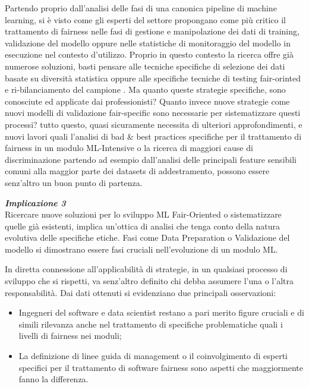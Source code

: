     Partendo proprio dall'analisi delle fasi di una canonica pipeline di machine learning, si è visto come gli esperti del settore propongano come più critico il trattamento di fairness nelle fasi di gestione e manipolazione dei dati di training, validazione del modello oppure nelle statistiche di monitoraggio del modello in esecuzione nel contesto d'utilizzo. Proprio in questo contesto la ricerca offre già numerose soluzioni, basti pensare alle tecniche specifiche di selezione dei dati basate su diversità statistica \cite{moumoulidou2020diverse} oppure alle specifiche tecniche di testing fair-orinted e ri-bilanciamento del campione \cite{galhotra2017fairness}. Ma quanto queste strategie specifiche, sono conosciute ed applicate dai professionisti? Quanto invece nuove strategie come nuovi modelli di validazione fair-specific sono necessarie per sistematizzare questi processi? tutto questo, quasi sicuramente necessita di ulteriori approfondimenti, e nuovi lavori quali l'analisi di bad \& best practices specifiche per il trattamento di fairness in un modulo ML-Intensive o la ricerca di maggiori cause di discriminazione partendo ad esempio dall'analisi delle principali feature sensibili comuni alla maggior parte dei datasets di addestramento, possono essere senz'altro un buon punto di partenza.
    
    \begin{center}
	
        \begin{tcolorbox}[width=\textwidth, colframe=black, colback=perla]
    			\begin{minipage}{\textwidth}
    				\textit{\faCaretSquareORight  \textbf{ Implicazione 3}}\\
    		    Ricercare nuove soluzioni per lo sviluppo ML Fair-Oriented o sistematizzare quelle già esistenti, implica un'ottica di analisi che tenga conto della natura evolutiva delle specifiche etiche. Fasi come Data Preparation o Validazione del modello si dimostrano essere fasi cruciali nell'evoluzione di un modulo ML.
    			\end{minipage}
		\end{tcolorbox}
	\end{center}
    
    In diretta connessione all'applicabilità di strategie, in un qualsiasi processo di sviluppo che si rispetti, va senz'altro definito chi debba assumere l'una o l'altra responsabilità. Dai dati ottenuti si evidenziano due principali osservazioni:
    \begin{itemize}
        \item  Ingegneri del software e data scientist restano a pari merito figure cruciali e di simili rilevanza anche nel trattamento di specifiche problematiche quali i livelli di fairness nei moduli;
        \item La definizione di linee guida di management o il coinvolgimento di esperti specifici per il trattamento di software fairness sono aspetti che maggiormente fanno la differenza.
    \end{itemize}
    
